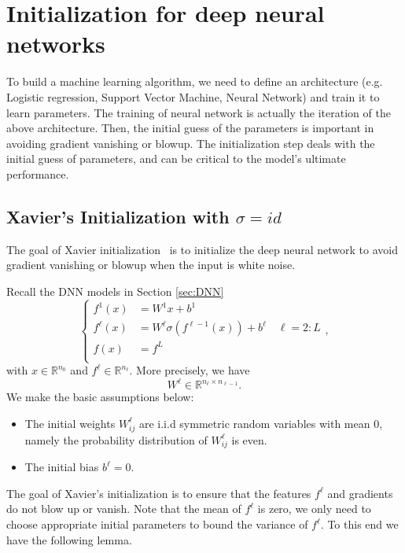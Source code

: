 \newpage
\section{Initialization for deep neural networks}
To build a machine learning algorithm, we need to define an architecture (e.g. Logistic regression, Support Vector Machine, Neural Network) and train it to learn parameters. The training of neural network is actually the iteration of the above architecture. Then, the initial guess of the parameters is important in avoiding gradient vanishing or blowup. 
The initialization step deals with the initial guess of parameters, and can be critical to the model's ultimate performance. 


\subsection{Xavier's Initialization with $\sigma  = id$}
The goal of Xavier initialization~\cite{glorot2010understanding} is to initialize the deep neural network to avoid gradient vanishing or blowup when the input is white noise. 


Recall the DNN models in Section \ref{sec:DNN}
\begin{equation}
\begin{cases}
f^1(x) &= W^1 x + b^1 \\
f^{\ell}(x) &= W^\ell \sigma(f^{\ell-1}(x)) + b^\ell \quad \ell = 2:L \\
f(x) &= f^{L} \\
\end{cases},
\end{equation}
with $x \in \mathbb{R}^{n_0}$ and $f^{\ell} \in \mathbb{R}^{n_\ell}$. More precisely, we have
\begin{equation}\label{key}
W^\ell \in \mathbb{R}^{n_{\ell} \times n_{\ell-1}}.
\end{equation}
We make the basic assumptions below:
\begin{itemize}
 \item The initial weights $W^\ell_{ij}$ are i.i.d symmetric random variables with mean $0$, namely the 
 probability distribution of $W^\ell_{ij}$ is even.
 \item The initial bias $b^\ell = 0$.
\end{itemize}
The goal of Xavier's initialization is to ensure that the features $f^\ell$ and gradients do not blow up or vanish. Note that the mean of $f^\ell$ is zero, we only need to choose appropriate initial parameters to bound the variance of $f^\ell$. To this end we have the following lemma.

